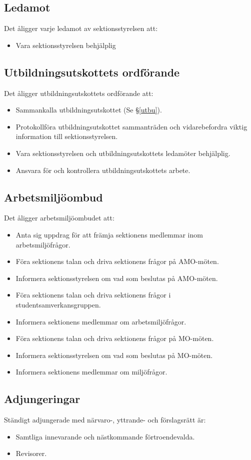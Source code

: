 \documentclass{datateknologsektionen-document}
\begin{document}
\subsection{Ledamot}
\label{ledamot}
Det åligger varje ledamot av sektionsstyrelsen att:
\begin{itemize}
  \item Vara sektionsstyrelsen behjälplig
\end{itemize}
\subsection{Utbildningsutskottets ordförande}
\label{utbuordf}
Det åligger utbildningsutskottets ordförande att:
\begin{itemize}
  \item Sammankalla utbildningsutskottet (Se \S \ref{utbu}).
  \item Protokollföra utbildningsutskottet sammanträden och vidarebefordra viktig information till sektionsstyrelsen.
  \item Vara sektionsstyrelsen och utbildningsutskottets ledamöter behjälplig.
  \item Ansvara för och kontrollera utbildningsutskottets arbete.
\end{itemize}
\subsection{Arbetsmiljöombud}
\label{amo}
Det åligger arbetsmiljöombudet att:
\begin{itemize}
  \item Anta sig uppdrag för att främja sektionens medlemmar inom arbetsmiljöfrågor.
  \item Föra sektionens talan och driva sektionens frågor på AMO-möten.
  \item Informera sektionsstyrelsen om vad som beslutas på AMO-möten.
  \item Föra sektionens talan och driva sektionens frågor i studentsamverkansgruppen.
  \item Informera sektionens medlemmar om arbetsmiljöfrågor.
  \item Föra sektionens talan och driva sektionens frågor på MO-möten.
  \item Informera sektionsstyrelsen om vad som beslutas på MO-möten.
  \item Informera sektionens medlemmar om miljöfrågor.
\end{itemize}
\subsection{Adjungeringar}
Ständigt adjungerade med närvaro-, yttrande- och förslagsrätt är:
\begin{itemize}
  \item Samtliga innevarande och nästkommande förtroendevalda.
  \item Revisorer.
\end{itemize}
\end{document}
